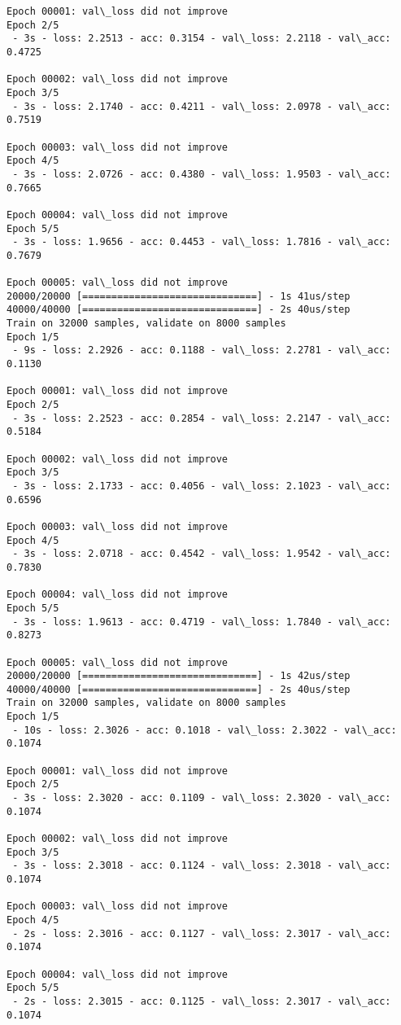 \documentclass[11pt]{article}
\begin{document}
\begin{Verbatim}[commandchars=\\\{\}]
Epoch 00001: val\_loss did not improve
Epoch 2/5
 - 3s - loss: 2.2513 - acc: 0.3154 - val\_loss: 2.2118 - val\_acc: 0.4725

Epoch 00002: val\_loss did not improve
Epoch 3/5
 - 3s - loss: 2.1740 - acc: 0.4211 - val\_loss: 2.0978 - val\_acc: 0.7519

Epoch 00003: val\_loss did not improve
Epoch 4/5
 - 3s - loss: 2.0726 - acc: 0.4380 - val\_loss: 1.9503 - val\_acc: 0.7665

Epoch 00004: val\_loss did not improve
Epoch 5/5
 - 3s - loss: 1.9656 - acc: 0.4453 - val\_loss: 1.7816 - val\_acc: 0.7679

Epoch 00005: val\_loss did not improve
20000/20000 [==============================] - 1s 41us/step
40000/40000 [==============================] - 2s 40us/step
Train on 32000 samples, validate on 8000 samples
Epoch 1/5
 - 9s - loss: 2.2926 - acc: 0.1188 - val\_loss: 2.2781 - val\_acc: 0.1130

Epoch 00001: val\_loss did not improve
Epoch 2/5
 - 3s - loss: 2.2523 - acc: 0.2854 - val\_loss: 2.2147 - val\_acc: 0.5184

Epoch 00002: val\_loss did not improve
Epoch 3/5
 - 3s - loss: 2.1733 - acc: 0.4056 - val\_loss: 2.1023 - val\_acc: 0.6596

Epoch 00003: val\_loss did not improve
Epoch 4/5
 - 3s - loss: 2.0718 - acc: 0.4542 - val\_loss: 1.9542 - val\_acc: 0.7830

Epoch 00004: val\_loss did not improve
Epoch 5/5
 - 3s - loss: 1.9613 - acc: 0.4719 - val\_loss: 1.7840 - val\_acc: 0.8273

Epoch 00005: val\_loss did not improve
20000/20000 [==============================] - 1s 42us/step
40000/40000 [==============================] - 2s 40us/step
Train on 32000 samples, validate on 8000 samples
Epoch 1/5
 - 10s - loss: 2.3026 - acc: 0.1018 - val\_loss: 2.3022 - val\_acc: 0.1074

Epoch 00001: val\_loss did not improve
Epoch 2/5
 - 3s - loss: 2.3020 - acc: 0.1109 - val\_loss: 2.3020 - val\_acc: 0.1074

Epoch 00002: val\_loss did not improve
Epoch 3/5
 - 3s - loss: 2.3018 - acc: 0.1124 - val\_loss: 2.3018 - val\_acc: 0.1074

Epoch 00003: val\_loss did not improve
Epoch 4/5
 - 2s - loss: 2.3016 - acc: 0.1127 - val\_loss: 2.3017 - val\_acc: 0.1074

Epoch 00004: val\_loss did not improve
Epoch 5/5
 - 2s - loss: 2.3015 - acc: 0.1125 - val\_loss: 2.3017 - val\_acc: 0.1074


\end{Verbatim}
\end{document}
